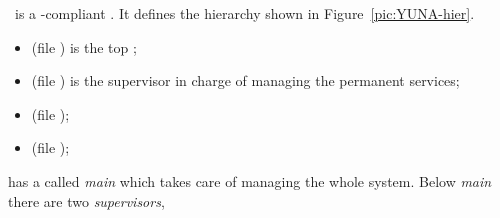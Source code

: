 \YUNA\ is a \OTP-compliant . It defines the hierarchy
shown in Figure~\ref{pic:YUNA-hier}.


\begin{itemize}

    \item   {} (file ) is the top
            ;

    \item   {} (file ) is
            the supervisor in charge of managing the permanent services;

    \item   {} (file );

    \item   {} (file );

\end{itemize}

has a  called \emph{main} which takes care of managing
the whole system. Below \emph{main} there are two \emph{supervisors},


